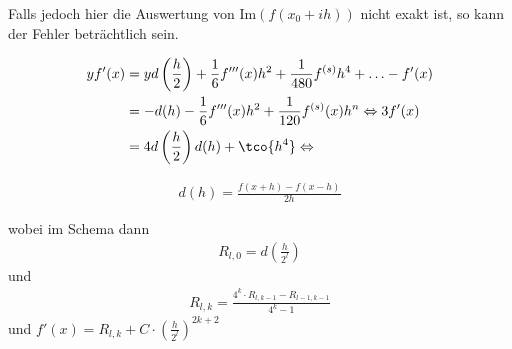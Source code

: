 Falls jedoch hier die Auswertung von $\text{Im}(f(x_0 + ih))$ nicht exakt ist, so kann der Fehler beträchtlich sein.


\begin{align*}
    y f'(x) & = y d\left(\frac{h}{2}\right) + \frac{1}{6} f'''(x) h^2 + \frac{1}{480}f^{(s)} h^4 + \ldots - f'(x) \\
            & = -d(h) - \frac{1}{6}f'''(x) h^2 + \frac{1}{120} f^{(s)}(x) h^n \Leftrightarrow 3 f'(x)             \\
            & = 4 d\left(\frac{h}{2}\right)  d(h) + \tco{h^4} \Leftrightarrow
\end{align*}



\begin{align*}
    d(h) = \frac{f(x + h) - f(x - h)}{2h}
\end{align*}

wobei im Schema dann
\begin{align*}
    R_{l, 0} = d\left( \frac{h}{2^l} \right)
\end{align*}
und
\begin{align*}
    R_{l, k} = \frac{4^k \cdot R_{l, k - 1} - R_{l - 1, k - 1}}{4^k - 1}
\end{align*}
und $f'(x) = R_{l, k} + C \cdot \left( \frac{h}{2^l} \right)^{2k + 2}$

